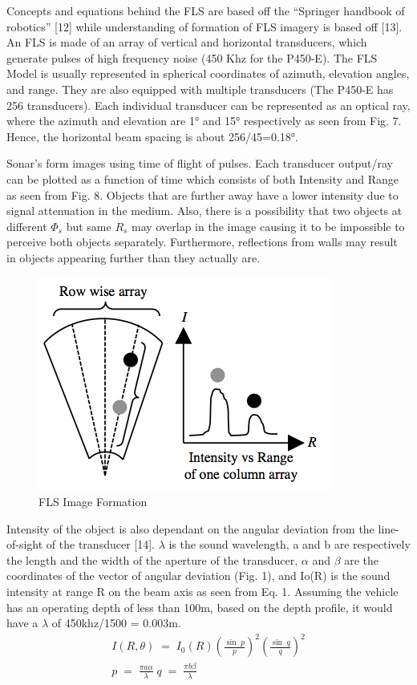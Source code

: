 \documentclass[a4paper]{IEEEtran}
\let\Phi\varPhi
\newcommand{\RSonar}{$\si{\textit{R}_{s}}$\xspace}
\newcommand{\PhiSonar}{$\si{\Phi_{s}}$\xspace}
\begin{document}
Concepts and equations behind the FLS are based off the “Springer handbook of robotics” [12] while understanding of formation of FLS imagery is based off [13]. An FLS is made of an array of vertical and horizontal transducers, which generate pulses of high frequency noise (450 Khz for the P450-E). The FLS Model is usually represented in spherical coordinates of azimuth, elevation angles, and range. They are also equipped with multiple transducers (The P450-E has 256 transducers). Each individual transducer can be represented as an optical ray, where the azimuth and elevation are 1\si{\degree} and 15\si{\degree} respectively as seen from Fig. 7. Hence, the horizontal beam spacing is about 256/45=0.18\si{\degree}. 

Sonar’s form images using time of flight of pulses. Each transducer output/ray can be plotted as a function of time which consists of both Intensity and Range as seen from Fig. 8. Objects that are further away have a lower intensity due to signal attenuation in the medium. Also, there is a possibility that two objects at different \PhiSonar but same \RSonar may overlap in the image causing it to be impossible to perceive both objects separately. Furthermore, reflections from walls may result in objects appearing further than they actually are.

\begin{figure}[h!]
  \centering
  \includegraphics[scale=0.4]{transducers}
  \captionsetup{justification=centering}
  \caption{FLS Image Formation}
\end{figure}

Intensity of the object is also dependant on the angular deviation from the line-of-sight of the transducer [14].  $\lambda$ is the sound wavelength, a and b are respectively the length and the width of the aperture of the transducer, $\alpha$ and $\beta$ are the coordinates of the vector of angular deviation (Fig. 1), and Io(R) is the sound intensity at range R on the beam axis as seen from Eq. 1. Assuming the vehicle has an operating depth of less than 100m, based on the depth profile, it would have a $\lambda$ of 450khz/1500 = 0.003m.
\begingroup\makeatletter\def\f@size{7}\check@mathfonts
\begin{gather}
I\left( R,\theta  \right)\; =\; I_{0}\left( R \right)\left( \frac{\sin \; p}{p} \right)^{2}\left( \frac{\sin \; q}{q} \right)^{2} \\
p\; =\; \frac{\pi a\alpha }{\lambda }\; q\; =\; \frac{\pi b\beta }{\lambda }\; 
\end{gather}
\endgroup
 
\end{document}
